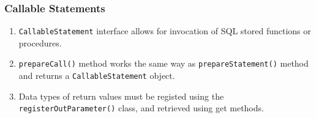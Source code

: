 \documentclass[journal,12pt,twocolumn]{IEEEtran}
\begin{document}
\subsubsection{Callable Statements}

\begin{enumerate}
     \item \texttt{CallableStatement} interface allows for invocation of SQL
     stored functions or procedures.
     \item \texttt{prepareCall()} method works the same way as 
     \texttt{prepareStatement()} method and returns a \texttt{CallableStatement} 
     object.
     \item Data types of return values must be registed using the
     \texttt{registerOutParameter()} class, and retrieved using get methods.
\end{enumerate}
\end{document}
